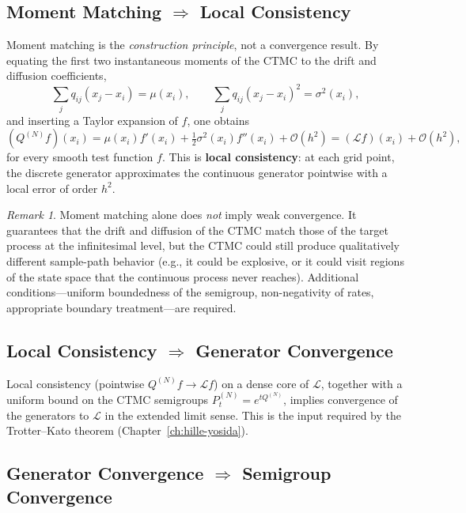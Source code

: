 \documentclass[11pt,a4paper,openany]{book}
\theoremstyle{definition}
\theoremstyle{plain}
\theoremstyle{remark}
\newtheorem{remark}[theorem]{Remark}
\newcommand{\1}{\mathbbm{1}}
\begin{document}
\subsection{Moment Matching $\Rightarrow$ Local Consistency}

Moment matching is the \emph{construction principle}, not a convergence result. By equating the first two instantaneous moments of the CTMC to the drift and diffusion coefficients,
\[
\sum_{j} q_{ij}(x_{j} - x_{i}) = \mu(x_{i}), \qquad
\sum_{j} q_{ij}(x_{j} - x_{i})^{2} = \sigma^{2}(x_{i}),
\]
and inserting a Taylor expansion of $f$, one obtains
\[
(Q^{(N)} f)(x_{i}) = \mu(x_{i}) f'(x_{i}) + \tfrac{1}{2} \sigma^{2}(x_{i}) f''(x_{i}) + \mathcal{O}(h^{2}) = (\mathcal{L} f)(x_{i}) + \mathcal{O}(h^{2}),
\]
for every smooth test function $f$. This is \textbf{local consistency}: at each grid point, the discrete generator approximates the continuous generator pointwise with a local error of order $h^{2}$.

\begin{remark}
Moment matching alone does \emph{not} imply weak convergence. It guarantees that the drift and diffusion of the CTMC match those of the target process at the infinitesimal level, but the CTMC could still produce qualitatively different sample-path behavior (e.g., it could be explosive, or it could visit regions of the state space that the continuous process never reaches). Additional conditions---uniform boundedness of the semigroup, non-negativity of rates, appropriate boundary treatment---are required.
\end{remark}

\subsection{Local Consistency $\Rightarrow$ Generator Convergence}

Local consistency (pointwise $Q^{(N)} f \to \mathcal{L} f$) on a dense core of $\mathcal{L}$, together with a uniform bound on the CTMC semigroups $P_{t}^{(N)} = e^{t Q^{(N)}}$, implies convergence of the generators to $\mathcal{L}$ in the extended limit sense. This is the input required by the Trotter--Kato theorem (Chapter~\ref{ch:hille-yosida}).

\subsection{Generator Convergence $\Rightarrow$ Semigroup Convergence}
\end{document}
